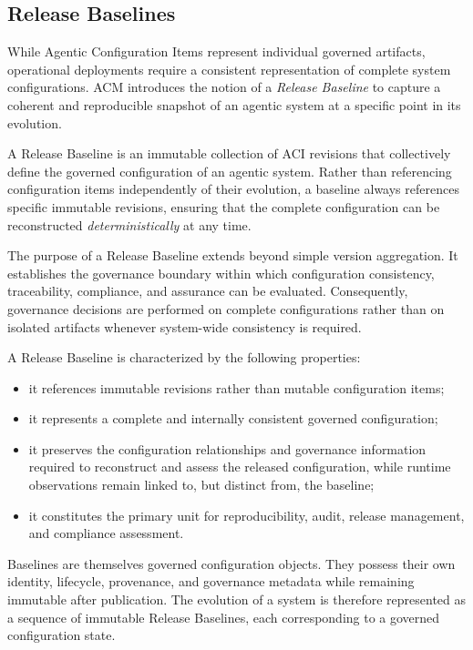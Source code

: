 \documentclass[10pt]{article}
\begin{document}
\subsection{Release Baselines}
\label{sec:release_baselines}

While Agentic Configuration Items represent individual governed artifacts, operational deployments require a consistent representation of complete system configurations. ACM introduces the notion of a \emph{Release Baseline} to capture a coherent and reproducible snapshot of an agentic system at a specific point in its evolution.

A Release Baseline is an immutable collection of ACI revisions that collectively define the governed configuration of an agentic system. Rather than referencing configuration items independently of their evolution, a baseline always references specific immutable revisions, ensuring that the complete configuration can be reconstructed \emph{deterministically} at any time.

The purpose of a Release Baseline extends beyond simple version aggregation. It establishes the governance boundary within which configuration consistency, traceability, compliance, and assurance can be evaluated. Consequently, governance decisions are performed on complete configurations rather than on isolated artifacts whenever system-wide consistency is required.

A Release Baseline is characterized by the following properties:

\begin{itemize}

\item it references immutable revisions rather than mutable configuration items;

\item it represents a complete and internally consistent governed configuration;

\item it preserves the configuration relationships and governance information
required to reconstruct and assess the released configuration, while runtime
observations remain linked to, but distinct from, the baseline;

\item it constitutes the primary unit for reproducibility, audit, release management, and compliance assessment.

\end{itemize}

Baselines are themselves governed configuration objects. They possess their own identity, lifecycle, provenance, and governance metadata while remaining immutable after publication. The evolution of a system is therefore represented as a sequence of immutable Release Baselines, each corresponding to a governed configuration state.
\end{document}
